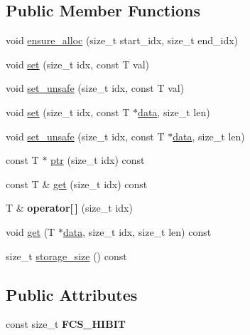 \subsection*{Public Member Functions}
\begin{DoxyCompactItemize}
\item 
void \hyperlink{classdialog_1_1monolog_1_1monolog__exp2__linear__base_a6daa5a4785866597eecfcdae2e333d0e}{ensure\+\_\+alloc} (size\+\_\+t start\+\_\+idx, size\+\_\+t end\+\_\+idx)
\item 
void \hyperlink{classdialog_1_1monolog_1_1monolog__exp2__linear__base_af292efeb7faae83c3f9e24f77a7f1fd8}{set} (size\+\_\+t idx, const T val)
\item 
void \hyperlink{classdialog_1_1monolog_1_1monolog__exp2__linear__base_a7adee243bf98901dbeb49c600ead38a5}{set\+\_\+unsafe} (size\+\_\+t idx, const T val)
\item 
void \hyperlink{classdialog_1_1monolog_1_1monolog__exp2__linear__base_a17d6ac9dfede2addd128f99cc7ea72bb}{set} (size\+\_\+t idx, const T $\ast$\hyperlink{structdialog_1_1data}{data}, size\+\_\+t len)
\item 
void \hyperlink{classdialog_1_1monolog_1_1monolog__exp2__linear__base_af4641b004a2e4341411872e5cfa9970d}{set\+\_\+unsafe} (size\+\_\+t idx, const T $\ast$\hyperlink{structdialog_1_1data}{data}, size\+\_\+t len)
\item 
const T $\ast$ \hyperlink{classdialog_1_1monolog_1_1monolog__exp2__linear__base_a73c30e25123e9b74ee03905a82a91c07}{ptr} (size\+\_\+t idx) const
\item 
const T \& \hyperlink{classdialog_1_1monolog_1_1monolog__exp2__linear__base_abe94ca8684b2554afe1e1a48b65aab59}{get} (size\+\_\+t idx) const
\item 
\mbox{\label{classdialog_1_1monolog_1_1monolog__exp2__linear__base_a1759654e89143242127d7cc3d174a3bb}} 
T \& {\bfseries operator\mbox{[}$\,$\mbox{]}} (size\+\_\+t idx)
\item 
void \hyperlink{classdialog_1_1monolog_1_1monolog__exp2__linear__base_aaf8379e07ff6a87efea96f603b7b38f9}{get} (T $\ast$\hyperlink{structdialog_1_1data}{data}, size\+\_\+t idx, size\+\_\+t len) const
\item 
size\+\_\+t \hyperlink{classdialog_1_1monolog_1_1monolog__exp2__linear__base_a2efcf4f9e75d769f4e7a5e2b0cf57776}{storage\+\_\+size} () const
\end{DoxyCompactItemize}
\subsection*{Public Attributes}
\begin{DoxyCompactItemize}
\item 
\mbox{\label{classdialog_1_1monolog_1_1monolog__exp2__linear__base_afc418da7129047821a3f557eba42fd58}} 
const size\+\_\+t {\bfseries F\+C\+S\+\_\+\+H\+I\+B\+IT}
\end{DoxyCompactItemize}
